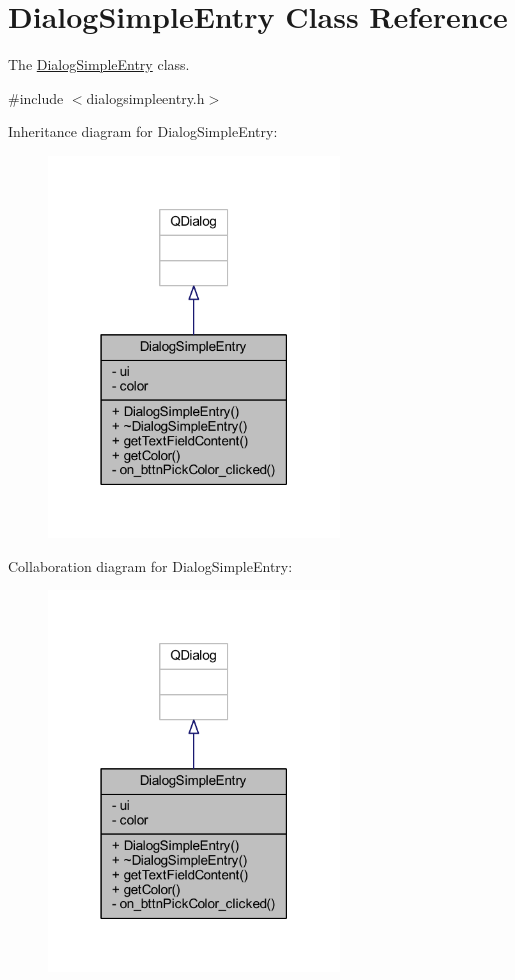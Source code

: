\hypertarget{class_dialog_simple_entry}{\section{Dialog\+Simple\+Entry Class Reference}
\label{class_dialog_simple_entry}
}


The \hyperlink{class_dialog_simple_entry}{Dialog\+Simple\+Entry} class.  




{\ttfamily \#include $<$dialogsimpleentry.\+h$>$}



Inheritance diagram for Dialog\+Simple\+Entry\+:
\nopagebreak
\begin{figure}[H]
\begin{center}
\leavevmode
\includegraphics[width=219pt]{class_dialog_simple_entry__inherit__graph}
\end{center}
\end{figure}


Collaboration diagram for Dialog\+Simple\+Entry\+:
\nopagebreak
\begin{figure}[H]
\begin{center}
\leavevmode
\includegraphics[width=219pt]{class_dialog_simple_entry__coll__graph}
\end{center}
\end{figure}
